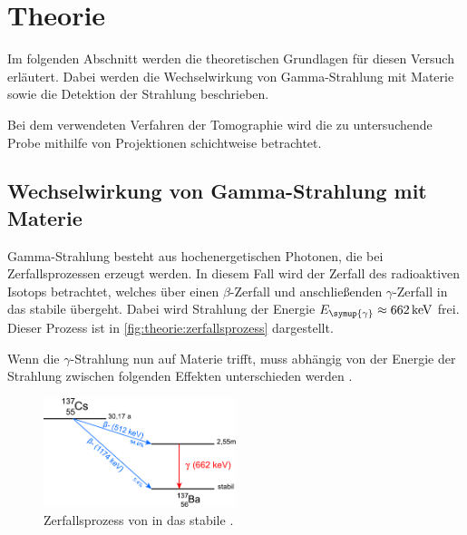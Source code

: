 \section{Theorie}
\label{sec:theorie}

    Im folgenden Abschnitt werden die theoretischen Grundlagen für diesen Versuch erläutert.
    Dabei werden die Wechselwirkung von Gamma-Strahlung mit Materie
    sowie die Detektion der Strahlung beschrieben.

    Bei dem verwendeten Verfahren der Tomographie wird die zu untersuchende Probe mithilfe von Projektionen schichtweise betrachtet.

\subsection{Wechselwirkung von Gamma-Strahlung mit Materie}

    Gamma-Strahlung besteht aus hochenergetischen Photonen, die bei Zerfallsprozessen erzeugt werden.
    In diesem Fall wird der Zerfall des radioaktiven Isotops  betrachtet,
    welches über einen $\beta$-Zerfall und anschließenden $\gamma$-Zerfall in das stabile  übergeht.
    Dabei wird Strahlung der Energie $E_{\symup{\gamma}} \approx \SI{662}{\kilo\eV}$ \cite{caesium} frei.
    Dieser Prozess ist in \autoref{fig:theorie:zerfallsprozess} dargestellt.

    Wenn die $\gamma$-Strahlung nun auf Materie trifft,
    muss abhängig von der Energie der Strahlung zwischen folgenden Effekten unterschieden werden \cite{radioaktivitaet}.

    \begin{figure}
       \centering
       \includegraphics[width=0.5\textwidth]{content/img/zerfallsschema_Leifi.pdf}
       \caption{Zerfallsprozess von  in das stabile . \cite{caesium}}
       \label{fig:theorie:zerfallsprozess}
    \end{figure}

